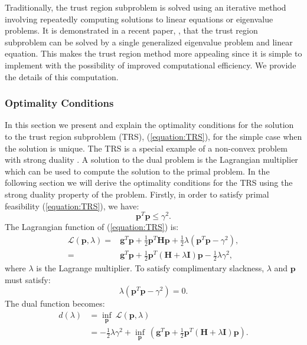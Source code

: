 \documentclass[letterpaper,12pt,titlepage,oneside,final]{book}
\begin{document}
	Traditionally, the trust region subproblem is solved using an iterative method involving repeatedly computing solutions to linear equations or eigenvalue problems. It is demonstrated in a recent paper, \cite{adachi.paper}, that the trust region subproblem can be solved by a single generalized eigenvalue problem and linear equation. This makes the trust region method more appealing since it is simple to implement with the possibility of improved computational efficiency. We provide the details of this computation.  
	
	\subsubsection{Optimality Conditions}
	
	In this section we present and explain the optimality conditions for the solution to the trust region subproblem (TRS), (\ref{equation:TRS}), for the simple case when the solution is unique. The TRS is a special example of a non-convex problem with strong duality \cite{boyd}. A solution to the dual problem is the Lagrangian multiplier which can be used to compute the solution to the primal problem. In the following section we will derive the optimality conditions for the TRS using the strong duality property of the problem. Firstly, in order to satisfy primal feasibility (\ref{equation:TRS}), we have:
	\begin{equation}
	\mathbf{p}^{T}\mathbf{p} \leq \gamma^2.
	\label{equation:inbounds}
	\end{equation}
	The Lagrangian function of (\ref{equation:TRS}) is:
	\begin{equation}
	\begin{split}
	\mathcal{L}(\mathbf{p},\lambda) = &\mathbf{g}^{T}\mathbf{p} + \frac{1}{2}\mathbf{p}^{T}\mathbf{Hp} + \frac{1}{2}\lambda (\mathbf{p}^{T}\mathbf{p} - \gamma^{2}),\\ = &\mathbf{g}^{T}\mathbf{p} + \frac{1}{2}\mathbf{p}^{T}(\mathbf{H} + \lambda\mathbf{I})\mathbf{p} - \frac{1}{2}\lambda\gamma^{2},
	\label{equation:lagrangian}
	\end{split}
	\end{equation}
	where $\lambda$ is the Lagrange multiplier. To satisfy complimentary slackness, $\lambda$ and $\mathbf{p}$ must satisfy:
	\begin{equation}
	\lambda(\mathbf{p}^{T}\mathbf{p} - \gamma^{2}) = 0.
	\label{equation:complementary_slackness}
	\end{equation}
	The dual function becomes:
	\begin{equation}
	\begin{aligned}
	d(\lambda) & = \underset{\mathbf{p}}{\inf}
	\ \mathcal{L}(\mathbf{p},\lambda)  \\
	& = -\frac{1}{2}\lambda\gamma^{2} + \underset{\mathbf{p}}{\inf}
	\ (\mathbf{g}^{T}\mathbf{p} + \frac{1}{2}\mathbf{p}^{T}(\mathbf{H} + \lambda\mathbf{I})\mathbf{p}). \\
	\label{equation:dual}
	\end{aligned}
	\end{equation}
\end{document}
